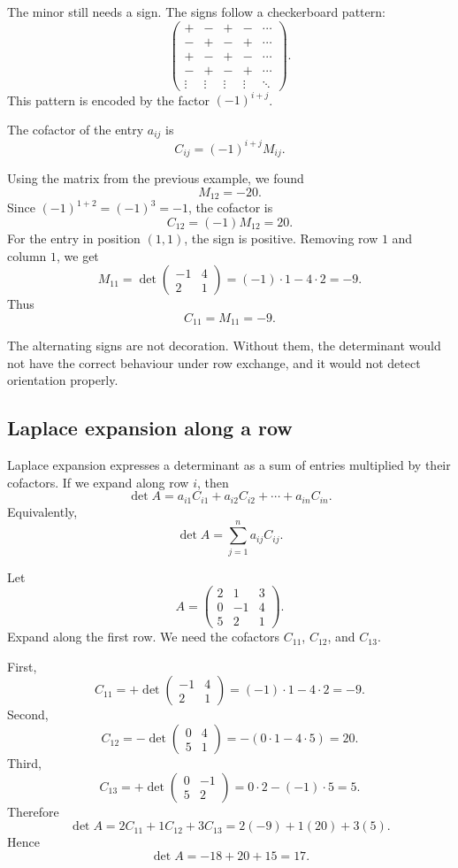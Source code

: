The minor still needs a sign. The signs follow a checkerboard pattern:
\[
\begin{pmatrix}
+&-&+&- & \cdots\\
-&+&-&+ & \cdots\\
+&-&+&- & \cdots\\
-&+&-&+ & \cdots\\
\vdots&\vdots&\vdots&\vdots&\ddots
\end{pmatrix}.
\]
This pattern is encoded by the factor \((-1)^{i+j}\).

\begin{definitionbox}
The cofactor of the entry \(a_{ij}\) is
\[
C_{ij}=(-1)^{i+j}M_{ij}.
\]
\end{definitionbox}

\begin{examplebox}
Using the matrix from the previous example, we found
\[
M_{12}=-20.
\]
Since \((-1)^{1+2}=(-1)^3=-1\), the cofactor is
\[
C_{12}=(-1)M_{12}=20.
\]
For the entry in position \((1,1)\), the sign is positive. Removing row \(1\) and column \(1\), we get
\[
M_{11}=\det\begin{pmatrix}-1&4\\2&1\end{pmatrix}=(-1)\cdot1-4\cdot2=-9.
\]
Thus
\[
C_{11}=M_{11}=-9.
\]
\end{examplebox}

The alternating signs are not decoration. Without them, the determinant would not have the correct behaviour under row exchange, and it would not detect orientation properly.

\subsection{Laplace expansion along a row}

Laplace expansion expresses a determinant as a sum of entries multiplied by their cofactors. If we expand along row \(i\), then
\[
\det A=a_{i1}C_{i1}+a_{i2}C_{i2}+\cdots+a_{in}C_{in}.
\]
Equivalently,
\[
\det A=\sum_{j=1}^{n}a_{ij}C_{ij}.
\]

\begin{examplebox}
Let
\[
A=\begin{pmatrix}
2&1&3\\
0&-1&4\\
5&2&1
\end{pmatrix}.
\]
Expand along the first row. We need the cofactors \(C_{11}\), \(C_{12}\), and \(C_{13}\).

First,
\[
C_{11}=+\det\begin{pmatrix}-1&4\\2&1\end{pmatrix}
=(-1)\cdot1-4\cdot2=-9.
\]
Second,
\[
C_{12}=-\det\begin{pmatrix}0&4\\5&1\end{pmatrix}
=-(0\cdot1-4\cdot5)=20.
\]
Third,
\[
C_{13}=+\det\begin{pmatrix}0&-1\\5&2\end{pmatrix}
=0\cdot2-(-1)\cdot5=5.
\]
Therefore
\[
\det A=2C_{11}+1C_{12}+3C_{13}
=2(-9)+1(20)+3(5).
\]
Hence
\[
\det A=-18+20+15=17.
\]
\end{examplebox}

